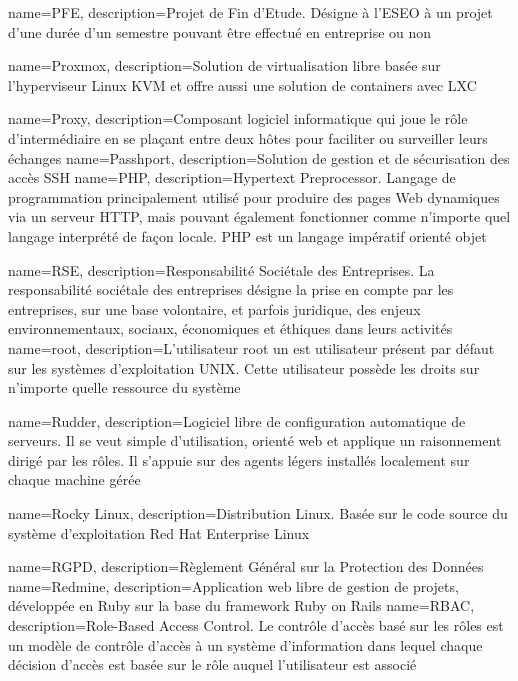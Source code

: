 {
    name=PFE,
    description={Projet de Fin d'Etude. Désigne à l'ESEO à un projet d'une durée d'un semestre pouvant être effectué en entreprise ou non}
}

{
    name=Proxmox,
    description={Solution de virtualisation libre basée sur l'hyperviseur Linux KVM et offre aussi une solution de containers avec LXC}
}

{
    name=Proxy,
    description={Composant logiciel informatique qui joue le rôle d'intermédiaire en se plaçant entre deux hôtes pour faciliter ou surveiller leurs échanges}
}
{
    name=Passhport,
    description={Solution de gestion et de sécurisation des accès SSH}
}
{
    name=PHP,
    description={Hypertext Preprocessor. Langage de programmation principalement utilisé pour produire des pages Web dynamiques via un serveur HTTP, mais pouvant également fonctionner comme n'importe quel langage interprété de façon locale. PHP est un langage impératif orienté objet}
}



{
    name=RSE,
    description={Responsabilité Sociétale des Entreprises. La responsabilité sociétale des entreprises désigne la prise en compte par les entreprises, sur une base volontaire, et parfois juridique, des enjeux environnementaux, sociaux, économiques et éthiques dans leurs activités}
}
{
    name=root,
    description={L'utilisateur root un est utilisateur présent par défaut sur les systèmes d'exploitation UNIX. Cette utilisateur possède les droits sur n'importe quelle ressource du système}
}


{
    name=Rudder,
    description={Logiciel libre de configuration automatique de serveurs. Il se veut simple d'utilisation, orienté web et applique un raisonnement dirigé par les rôles. Il s'appuie sur des agents légers installés localement sur chaque machine gérée}
}

{
    name=Rocky Linux,
    description={Distribution Linux. Basée sur le code source du système d'exploitation Red Hat Enterprise Linux}
}

{
    name=RGPD,
    description={Règlement Général sur la Protection des Données}
}
{
    name=Redmine,
    description={Application web libre de gestion de projets, développée en Ruby sur la base du framework Ruby on Rails}
}
{
    name=RBAC,
    description={Role-Based Access Control. Le contrôle d'accès basé sur les rôles est un modèle de contrôle d'accès à un système d'information dans lequel chaque décision d'accès est basée sur le rôle auquel l'utilisateur est associé}
}


